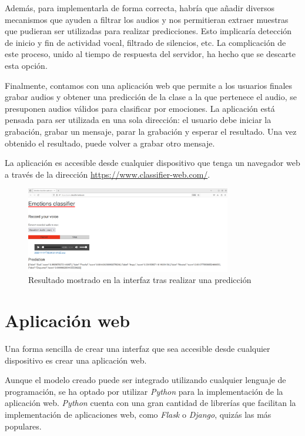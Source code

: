 Además, para implementarla de forma correcta, habría que añadir diversos mecanismos que ayuden a filtrar los audios y nos permitieran extraer muestras que pudieran ser utilizadas para realizar predicciones.
Esto implicaría detección de inicio y fin de actividad vocal, filtrado de silencios, etc.
La complicación de este proceso, unido al tiempo de respuesta del servidor, ha hecho que se descarte esta opción.

Finalmente, contamos con una aplicación web que permite a los usuarios finales grabar audios y obtener una predicción de la clase a la que pertenece el audio, se presuponen audios válidos para clasificar por emociones.
La aplicación está pensada para ser utilizada en una sola dirección: el usuario debe iniciar la grabación, grabar un mensaje, parar la grabación y esperar el resultado.
Una vez obtenido el resultado, puede volver a grabar otro mensaje.

La aplicación es accesible desde cualquier dispositivo que tenga un navegador web a través de la dirección \url{https://www.classifier-web.com/}.

\begin{figure}[htpb]
    \centering
    \includegraphics[width=0.8\textwidth]{cap3/images/interfaz-web.png}
    \caption{Resultado mostrado en la interfaz tras realizar una predicción}
    \label{fig:interfaz-web}
\end{figure}


\section{Aplicación web}
Una forma sencilla de crear una interfaz que sea accesible desde cualquier dispositivo es crear una aplicación web.

Aunque el modelo creado puede ser integrado utilizando cualquier lenguaje de programación, se ha optado por utilizar \textit{Python} para la implementación de la aplicación web.
\textit{Python} cuenta con una gran cantidad de librerías que facilitan la implementación de aplicaciones web, como \textit{Flask} o \textit{Django}, quizás las más populares.

